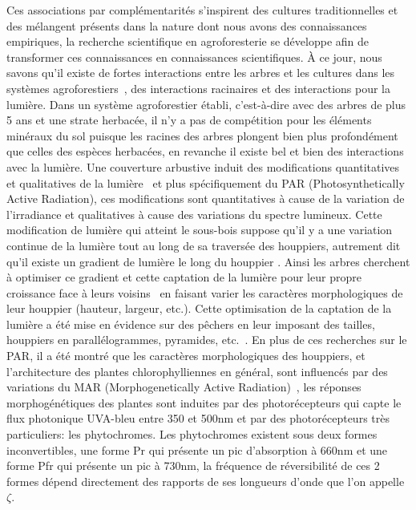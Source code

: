 \documentclass[12pt]{report}
\begin{document}
Ces associations par complémentarités s'inspirent des cultures traditionnelles
et des mélangent présents dans la nature dont nous avons des connaissances
empiriques, la recherche scientifique en agroforesterie se développe afin de
transformer ces connaissances en connaissances scientifiques. À ce jour, nous
savons qu'il existe de fortes interactions entre les arbres et les cultures dans
les systèmes agroforestiers~\citep{AF_ref48,AF_ref49,AF_ref47},
des interactions racinaires et des interactions pour la lumière. Dans un système
agroforestier établi, c'est-à-dire avec des arbres de plus 5 ans et une strate
herbacée, il n'y a pas de compétition pour les éléments minéraux du sol puisque
les racines des arbres plongent bien plus profondément que celles des espèces
herbacées, en revanche il existe bel et bien des interactions avec la lumière.
Une couverture arbustive induit des modifications quantitatives et qualitatives
de la lumière~\citep{MAR_ref36} et plus spécifiquement du PAR
(Photosynthetically Active Radiation), ces modifications sont quantitatives à
cause de la variation de l'irradiance et qualitatives à cause des variations du
spectre lumineux. Cette modification de lumière qui atteint le sous-bois suppose
qu'il y a une variation continue de la lumière tout au long de sa traversée des
houppiers, autrement dit qu'il existe un gradient de lumière le long du houppier
\citep{MAR_ref31,MAR_ref35}. Ainsi les arbres cherchent à optimiser ce
gradient et cette captation de la lumière pour leur propre croissance face à
leurs voisins~\citep{MAR_ref52} en faisant varier les caractères morphologiques de leur
houppier (hauteur, largeur, etc.). Cette optimisation de la captation de la lumière a été mise
en évidence sur des pêchers en leur imposant des tailles, houppiers en
parallélogrammes, pyramides, etc.~\citep{MAR_ref26}. En plus de ces recherches
sur le PAR, il a été montré que les caractères morphologiques des houppiers, et
l'architecture des plantes chlorophylliennes en général, sont influencés par des
variations du MAR (Morphogenetically Active Radiation)~\citep{MAR_ref35}, les réponses
morphogénétiques des plantes sont induites par des photorécepteurs qui capte le flux
photonique UVA-bleu entre 350 et 500nm et par des photorécepteurs très particuliers: les
phytochromes. Les phytochromes existent sous deux formes inconvertibles, une
forme Pr qui présente un pic d'absorption à 660nm et une forme Pfr qui présente
un pic à 730nm, la fréquence de réversibilité de ces 2 formes dépend directement
des rapports de ses longueurs d'onde que l'on appelle $\zeta$.
\end{document}
